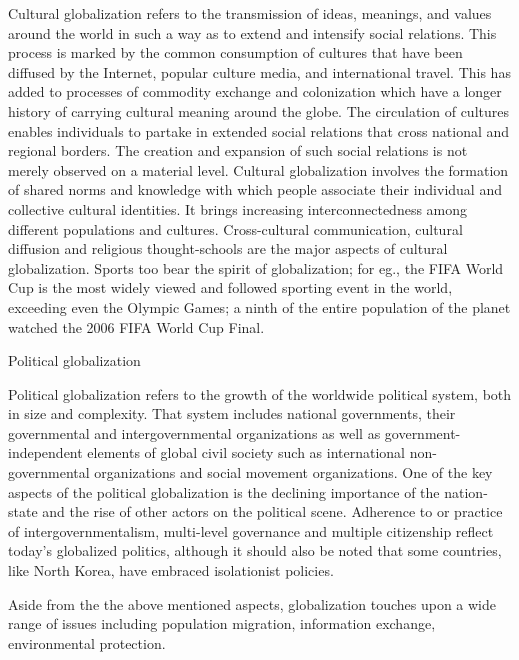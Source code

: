 \documentclass[
  openany]{book}
\begin{document}
Cultural globalization refers to the transmission of ideas, meanings, and values around the world in such a way as to extend and intensify social relations. This process is marked by the common consumption of cultures that have been diffused by the Internet, popular culture media, and international travel. This has added to processes of commodity exchange and colonization which have a longer history of carrying cultural meaning around the globe. The circulation of cultures enables individuals to partake in extended social relations that cross national and regional borders. The creation and expansion of such social relations is not merely observed on a material level. Cultural globalization involves the formation of shared norms and knowledge with which people associate their individual and collective cultural identities. It brings increasing interconnectedness among different populations and cultures. Cross-cultural communication, cultural diffusion and religious thought-schools are the major aspects of cultural globalization. Sports too bear the spirit of globalization; for eg., the FIFA World Cup is the most widely viewed and followed sporting event in the world, exceeding even the Olympic Games; a ninth of the entire population of the planet watched the 2006 FIFA World Cup Final.

Political globalization

Political globalization refers to the growth of the worldwide political system, both in size and complexity. That system includes national governments, their governmental and intergovernmental organizations as well as government-independent elements of global civil society such as international non-governmental organizations and social movement organizations. One of the key aspects of the political globalization is the declining importance of the nation-state and the rise of other actors on the political scene. Adherence to or practice of intergovernmentalism, multi-level governance and multiple citizenship reflect today's globalized politics, although it should also be noted that some countries, like North Korea, have embraced isolationist policies.

Aside from the the above mentioned aspects, globalization touches upon a wide range of issues including population migration, information exchange, environmental protection.
\end{document}
